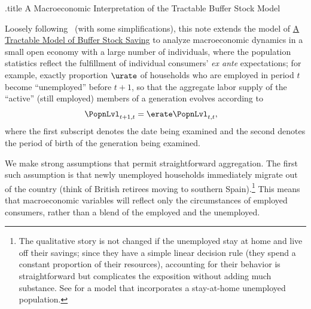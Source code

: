 \documentclass{econark}
\begin{document}
\handoutHeader

\begin{verbatimwrite}{\jobname.title}
A Macroeconomic Interpretation of the Tractable Buffer Stock Model
\end{verbatimwrite}

\handoutNameMake

Loosely following~\cite{cjSOE} (with some simplifications), this note extends the model of \href{\HandoutPDF}{A Tractable Model of Buffer Stock Saving} to analyze macroeconomic dynamics in a
small open economy with a large number of individuals, where the
population statistics reflect the fulfillment of individual consumers'
{\it ex ante} expectations; for example, exactly proportion $\urate$
of households who are employed in period $t$ become ``unemployed'' before
$t+1$, so that the aggregate labor supply of the ``active'' (still employed) members of a generation
evolves according to
\begin{equation}\begin{gathered}\begin{aligned}
  \PopnLvl_{t+1,t} & =  \erate \PopnLvl_{t,t}
,
\end{aligned}\end{gathered}\end{equation}
where the first subscript denotes the date being examined and the second denotes
the period of birth of the generation being examined.

We make strong assumptions that permit straightforward aggregation. The first such assumption is that newly unemployed households immediately migrate out of the
country (think of British retirees moving to southern
Spain).\footnote{The qualitative story is not changed if the unemployed stay at home and live off their savings; since they have a simple linear
  decision rule (they spend a constant proportion of their resources),
  accounting for their behavior is straightforward but
  complicates the exposition without adding much substance.  See \cite{cjSOE} for a model that incorporates a stay-at-home unemployed population.}
This means that macroeconomic variables will reflect only the circumstances of 
employed consumers, rather than a blend of the employed and the unemployed.
\end{document}
